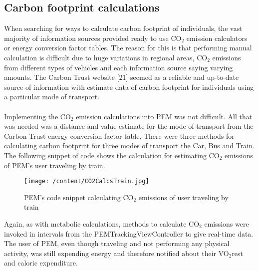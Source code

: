 \documentclass[12pt, a4paper]{report}   %
\begin{document}
\begin{enumerate}
\section{Carbon footprint calculations}
When searching for ways to calculate carbon footprint of individuals, the vast majority of information sources provided ready to use CO$_{2}$ emission calculators or energy conversion factor tables. The reason for this is that performing manual calculation is difficult due to huge variations in regional areas, CO$_{2}$ emissions from different types of vehicles and each information source saying varying amounts. The Carbon Trust website [21] seemed as a reliable and up-to-date source of information with estimate data of carbon footprint for individuals using a particular mode of transport.\\ \\
Implementing the CO$_{2}$ emission calculations into PEM was not difficult. All that was needed was a distance and value estimate for the mode of transport from the Carbon Trust energy conversion factor table. There were three methods for calculating carbon footprint for three modes of transport the Car, Bus and Train. The following snippet of code shows the calculation for estimating CO$_{2}$ emissions of PEM's user traveling by train.


\begin{figure}[H]
  \centering
	\texttt{[image: /content/CO2CalcsTrain.jpg]}
	  \caption{PEM's code snippet calculating CO$_{2}$ emissions of user traveling by train}
\end{figure}


Again, as with metabolic calculations, methods to calculate CO$_{2}$ emissions were invoked in intervals from the PEMTrackingViewController to give real-time data.
The user of PEM, even though traveling and not performing any physical activity, was still expending energy and therefore notified about their VO$_{2}$rest and caloric expenditure.\\ \\


\clearpage

\end{enumerate}
\end{document}
